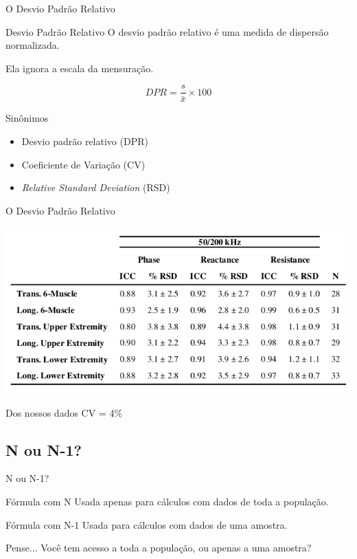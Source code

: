 \documentclass{beamer}
\begin{document}
\begin{frame}{\scriptsize O Desvio Padrão Relativo}
  \begin{block}{Desvio Padrão Relativo}
    \footnotesize
    O desvio padrão relativo é uma medida de dispersão \alert{normalizada}.

    \bigskip
    Ela ignora a escala da mensuração.

    $$DPR = \frac{s}{\bar{x}}\times 100$$
  \end{block}
  \begin{exampleblock}{Sinônimos}
    \footnotesize
    \begin{itemize}
    \footnotesize
    \item Desvio padrão relativo (DPR)
    \item Coeficiente de Variação (CV)
    \item {\em Relative Standard Deviation} (RSD)
  \end{itemize}
  \end{exampleblock}
\end{frame}

\begin{frame}{\scriptsize O Desvio Padrão Relativo}
  \begin{center}
    \includegraphics[width=\textwidth]{Cap3/RSD1}
  \end{center}
  \begin{exampleblock}{Dos nossos dados}
    \footnotesize
    CV = 4\%
  \end{exampleblock}
\end{frame}

\subsection{N ou N-1?}

\begin{frame}{\scriptsize N ou N-1?}
  \begin{block}{Fórmula com N}
    \footnotesize
    Usada apenas para cálculos com dados de toda a população.
  \end{block}
  \begin{block}{Fórmula com N-1}
    \footnotesize
    Usada para cálculos com dados de uma amostra.
  \end{block}
  \begin{block}{Pense...}
    \footnotesize
      Você tem acesso a toda a população, ou apenas a uma amostra?
  \end{block}
\end{frame}
\end{document}
